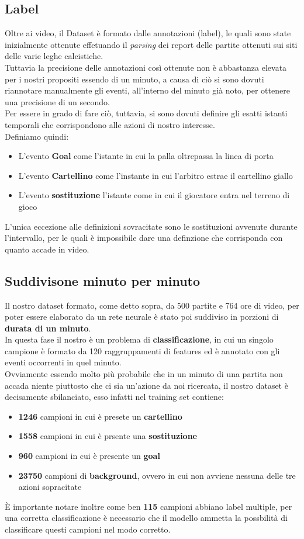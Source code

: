 \subsection{Label}
Oltre ai video, il Dataset è formato dalle annotazioni (label), le quali sono state inizialmente ottenute effetuando il \textit{parsing} dei report delle partite ottenuti sui siti delle varie leghe calcistiche.
\\Tuttavia la precisione delle annotazioni così ottenute non è abbastanza elevata per i nostri propositi essendo di un minuto, a causa di ciò si sono dovuti riannotare manualmente gli eventi, all'interno del minuto già noto, per ottenere una precisione di un secondo.
\\Per essere in grado di fare ciò, tuttavia, si sono dovuti definire gli esatti istanti temporali che corrispondono alle azioni di nostro interesse.
\\Definiamo quindi:
\begin{itemize}
\item L'evento \textbf{Goal} come l'istante in cui la palla oltrepassa la linea di porta
\item L'evento \textbf{Cartellino} come l'instante in cui l'arbitro estrae il cartellino giallo
\item L'evento \textbf{sostituzione} l'istante come in cui il giocatore entra nel terreno di gioco
\end{itemize}
L'unica eccezione alle definizioni sovracitate sono le sostituzioni avvenute durante l'intervallo, per le quali è impossibile dare una definzione che corrisponda con quanto accade in video.
\subsection{Suddivisone minuto per minuto}
Il nostro dataset formato, come detto sopra, da 500 partite e 764 ore di video, per poter essere elaborato da un rete neurale è stato poi suddiviso in porzioni di \textbf{durata di un minuto}.
\\In questa fase il nostro è un problema di \textbf{classificazione}, in cui un singolo campione è formato da 120 raggruppamenti di features ed è annotato con gli eventi occorrenti in quel minuto.
\\Ovviamente essendo molto più probabile che in un minuto di una partita non accada niente piuttosto che ci sia un'azione da noi ricercata, il nostro dataset è decisamente sbilanciato, esso infatti nel training set contiene:
\begin{itemize}
\item \textbf{1246} campioni in cui è presete un \textbf{cartellino}
\item \textbf{1558} campioni in cui è prsente una \textbf{sostituzione}
\item \textbf{960} campioni in cui è presente un \textbf{goal}
\item \textbf{23750} campioni di \textbf{background}, ovvero in cui non avviene nessuna delle tre azioni sopracitate
\end{itemize}
È importante notare inoltre come ben \textbf{115} campioni abbiano label multiple, per una corretta classificazione è necessario che il modello ammetta la possbilità di classificare questi campioni nel modo corretto.
